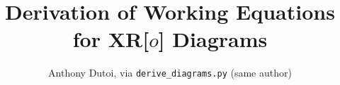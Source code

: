 \documentclass[12pt,letterpaper]{article}
\begin{document}



\title{Derivation of Working Equations for XR[$o$] Diagrams}
\author{Anthony Dutoi, via \texttt{derive\_diagrams.py} (same author)}
\maketitle


\begin{spacing}{0.75}


\end{spacing}
\end{document}
